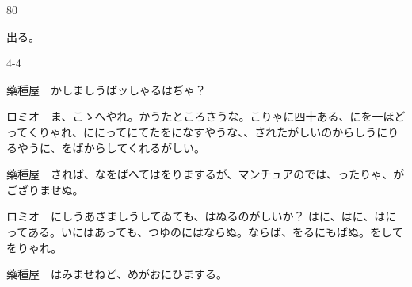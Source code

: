\documentclass[tate,paper=b6j,jafontsize=9pt]{jlreq}
\begin{document}
\begin{azconvIndented}{8\zw}{0\zw}

出る。

\end{azconvIndented}
\begin{azconvIndented}{4\zw}{-4\zw}

藥種屋　かしましうばッしゃるはぢゃ？

ロミオ　ま、こゝへやれ。かうたところさうな。こりゃに四十ある、にを一ほどってくりゃれ、ににってにてたをになすやうな、、されたがしいのからしうにりるやうに、をばからしてくれるがしい。

藥種屋　されば、なをばへてはをりまするが、マンチュアのでは、ったりゃ、がござりませぬ。

ロミオ　にしうあさましうしてゐても、はぬるのがしいか？ はに、はに、はにってある。いにはあっても、つゆのにはならぬ。ならば、をるにもばぬ。をしてをりゃれ。

藥種屋　はみませねど、めがおにひまする。


\end{azconvIndented}
\end{document}
